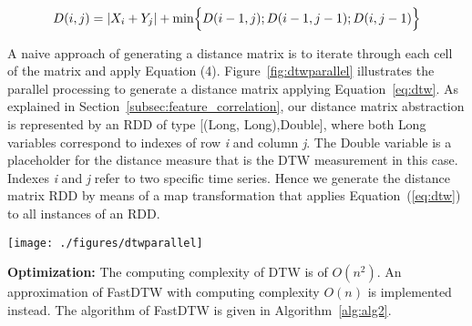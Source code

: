 \begin{equation}\label{eq:dtw}
D(i,j) = | X_i + Y_j |  + \min \Bigl\{ D(i-1,j); D(i-1,j-1); 
D(i,j-1) \Bigr\} 
\end{equation}

A naive approach of generating a distance matrix is to iterate through each cell of the matrix and apply Equation (4). Figure~\ref{fig:dtwparallel} illustrates the parallel processing to generate a distance matrix applying Equation~\ref{eq:dtw}. As explained in Section~\ref{subsec:feature_correlation}, our distance matrix abstraction is represented by an RDD of type \textsf{[(Long, Long),Double]}, where both \textsf{Long} variables correspond to indexes of row \textit{i} and column \textit{j}. The \textsf{Double} variable is a placeholder for the distance measure that is the DTW measurement in this case. Indexes \textit{i} and \textit{j} refer to two specific time series.  Hence we generate the distance matrix RDD by means of a \textsf{map} transformation that applies Equation~(\ref{eq:dtw}) to all instances of an RDD.

\begin{figure*}
    \centering
	\texttt{[image: ./figures/dtwparallel]}
	{\caption{The DTW Distance Matrix Computation in Spark. A mapping transformation calculating the DTW algorithm is applied to a an RDD of indexes. Each of these indexes correspond to vectors of values which defines the timeserie.}
		\label{fig:dtwparallel}}
\end{figure*} 


\textbf{Optimization:} The computing complexity of DTW is of $O(n^2)$. An approximation of FastDTW \cite{salvador2007} with computing complexity $O(n)$ is implemented instead. The algorithm of FastDTW is given in Algorithm~\ref{alg:alg2}.

